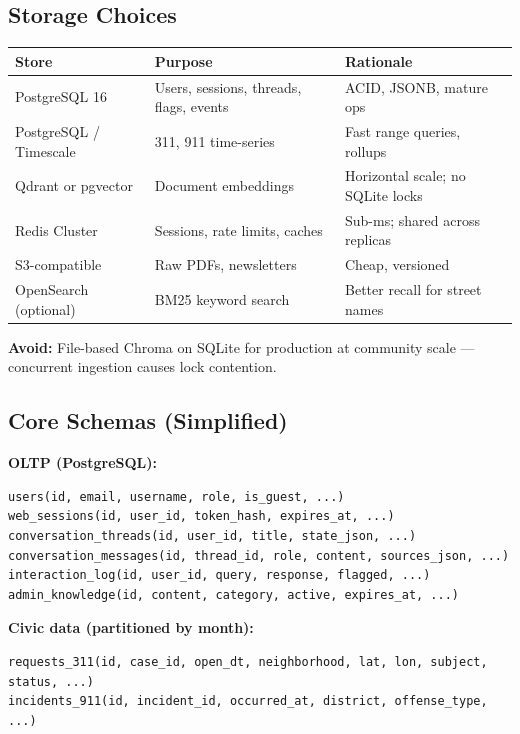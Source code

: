 \documentclass[11pt,a4paper]{article}
\begin{document}
\subsection{Storage Choices}
\begin{table}[h]
\centering
\small
\begin{tabular}{@{}llp{5.5cm}@{}}
\toprule
\textbf{Store} & \textbf{Purpose} & \textbf{Rationale} \\
\midrule
PostgreSQL 16 & Users, sessions, threads, flags, events & ACID, JSONB, mature ops \\
PostgreSQL / Timescale & 311, 911 time-series & Fast range queries, rollups \\
Qdrant or pgvector & Document embeddings & Horizontal scale; no SQLite locks \\
Redis Cluster & Sessions, rate limits, caches & Sub-ms; shared across replicas \\
S3-compatible & Raw PDFs, newsletters & Cheap, versioned \\
OpenSearch (optional) & BM25 keyword search & Better recall for street names \\
\bottomrule
\end{tabular}
\end{table}

\textbf{Avoid:} File-based Chroma on SQLite for production at community scale --- concurrent ingestion causes lock contention.

\subsection{Core Schemas (Simplified)}

\textbf{OLTP (PostgreSQL):}
\begin{lstlisting}
users(id, email, username, role, is_guest, ...)
web_sessions(id, user_id, token_hash, expires_at, ...)
conversation_threads(id, user_id, title, state_json, ...)
conversation_messages(id, thread_id, role, content, sources_json, ...)
interaction_log(id, user_id, query, response, flagged, ...)
admin_knowledge(id, content, category, active, expires_at, ...)
\end{lstlisting}

\textbf{Civic data (partitioned by month):}
\begin{lstlisting}
requests_311(id, case_id, open_dt, neighborhood, lat, lon, subject, status, ...)
incidents_911(id, incident_id, occurred_at, district, offense_type, ...)
\end{lstlisting}
\end{document}
